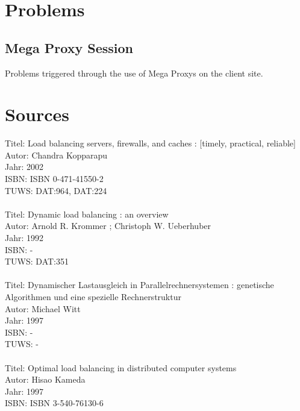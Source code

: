 \documentclass[12p]{article}
\begin{document}
	\newpage
	\section{Problems}
	\subsection{Mega Proxy Session}
	Problems triggered through the use of Mega Proxys on the client site.
	
	\newpage
	\printglossaries
	
	\newpage
	
	
	
	\newpage
	\section{Sources}
	Titel:    Load balancing servers, firewalls, and caches : [timely, practical, reliable]\\
	Autor:    Chandra Kopparapu\\
	Jahr:    2002\\
	ISBN:    ISBN 0-471-41550-2\\
	TUWS:    DAT:964, DAT:224\\
	\\
	Titel:    Dynamic load balancing : an overview\\
	Autor:    Arnold R. Krommer ; Christoph W. Ueberhuber\\
	Jahr:    1992\\
	ISBN:     -\\
	TUWS:    DAT:351\\
	\\
	Titel:    Dynamischer Lastausgleich in Parallelrechnersystemen : genetische Algorithmen und eine spezielle Rechnerstruktur\\
	Autor:    Michael Witt\\
	Jahr:    1997\\
	ISBN:    -\\
	TUWS:    -\\
	\\
	Titel:    Optimal load balancing in distributed computer systems\\
	Autor:    Hisao Kameda\\
	Jahr:    1997\\
	ISBN:    ISBN 3-540-76130-6\\
\end{document}
